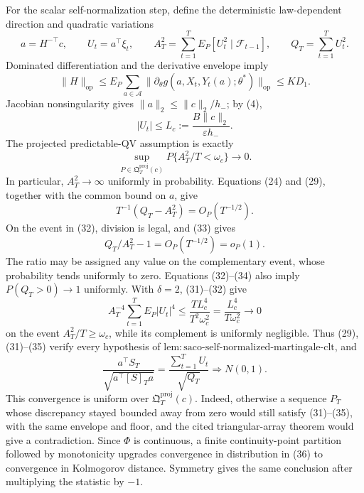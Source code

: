 For the scalar self-normalization step, define the deterministic law-dependent direction and quadratic variations
\[
 a=H^{-\top}c,\qquad U_t=a^\top\xi_t,\qquad
 A_T^2=\sum_{t=1}^T E_P[U_t^2\mid\mathcal F_{t-1}],\qquad
 Q_T=\sum_{t=1}^T U_t^2.
 \tag{29}
\]
Dominated differentiation and the derivative envelope imply
\[
 \|H\|_{\mathrm{op}}
 \le E_P\sum_{a\in\mathcal A}
 \|\partial_\theta g(a,X_t,Y_t(a);\theta^*)\|_{\mathrm{op}}
 \le KD_1.
 \tag{30}
\]
Jacobian nonsingularity gives \(\|a\|_2\le\|c\|_2/h_-\); by (4),
\[
 |U_t|\le L_c:=\frac{B\|c\|_2}{\varepsilon h_-}.
 \tag{31}
\]
The projected predictable-QV assumption is exactly
\[
 \sup_{P\in\mathfrak Q_T^{\mathrm{proj}}(c)}
 P\{A_T^2/T<\omega_c\}\longrightarrow0.
 \tag{32}
\]
In particular, \(A_T^2\to\infty\) uniformly in probability. Equations (24) and (29), together with the common bound on \(a\), give
\[
 T^{-1}(Q_T-A_T^2)=O_P(T^{-1/2}).
 \tag{33}
\]
On the event in (32), division is legal, and (33) gives
\[
 Q_T/A_T^2-1=O_P(T^{-1/2})=o_P(1).
 \tag{34}
\]
The ratio may be assigned any value on the complementary event, whose probability tends uniformly to zero. Equations (32)--(34) also imply \(P(Q_T>0)\to1\) uniformly. With \(\delta=2\), (31)--(32) give
\[
 A_T^{-4}\sum_{t=1}^T E_P|U_t|^4
 \le \frac{TL_c^4}{T^2\omega_c^2}
 =\frac{L_c^4}{T\omega_c^2}\longrightarrow0
 \tag{35}
\]
on the event \(A_T^2/T\ge\omega_c\), while its complement is uniformly negligible. Thus (29), (31)--(35) verify every hypothesis of \(\mathrm{lem:saco\text{-}self\text{-}normalized\text{-}martingale\text{-}clt}\), and
\[
 \frac{a^\top S_T}{\sqrt{a^\top[S]_Ta}}
 =\frac{\sum_{t=1}^T U_t}{\sqrt{Q_T}}
 \Rightarrow N(0,1).
 \tag{36}
\]
This convergence is uniform over \(\mathfrak Q_T^{\mathrm{proj}}(c)\). Indeed, otherwise a sequence \(P_T\) whose discrepancy stayed bounded away from zero would still satisfy (31)--(35), with the same envelope and floor, and the cited triangular-array theorem would give a contradiction. Since \(\Phi\) is continuous, a finite continuity-point partition followed by monotonicity upgrades convergence in distribution in (36) to convergence in Kolmogorov distance. Symmetry gives the same conclusion after multiplying the statistic by \(-1\).

